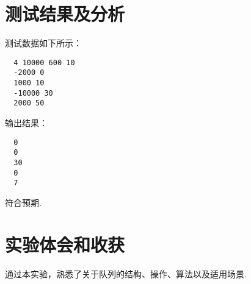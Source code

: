 \documentclass[UTF8]{ctexart}
\begin{document}
\section{测试结果及分析}
测试数据如下所示：
\begin{lstlisting}
  4 10000 600 10 
  -2000 0 
  1000 10 
  -10000 30 
  2000 50
\end{lstlisting}
输出结果：
\begin{lstlisting}
  0
  0
  30
  0
  7
\end{lstlisting}
符合预期.
\section{实验体会和收获}
通过本实验，熟悉了关于队列的结构、操作、算法以及适用场景.
\end{document}
